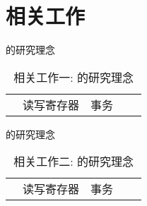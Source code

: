 \section{相关工作}	\label{section:related-work}

\begin{frame}{\ideadt{}的研究理念}
  \begin{table}
	\centering
	\begin{tabular}{|c|c|c|c|c|}
	  \hline
	  & 读写寄存器 & 事务
	\end{tabular}
	\caption{相关工作一: \ideadt{}的研究理念}
	\label{tbl:ideadt-related-work}
  \end{table}
\end{frame}
\begin{frame}{\idearm{}的研究理念}
  \begin{table}
	\centering
	\begin{tabular}{|c|c|c|c|c|}
	  \hline
	  & 读写寄存器 & 事务
	\end{tabular}
	\caption{相关工作二: \idearm{}的研究理念}
	\label{tbl:idearm-related-work}
  \end{table}
\end{frame}
